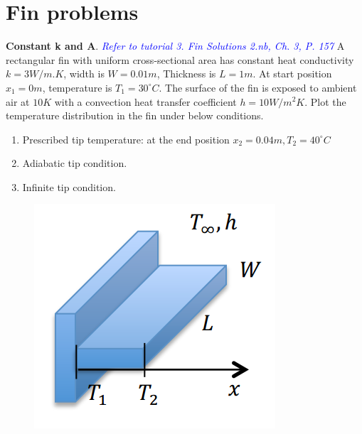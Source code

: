 \section{Fin problems}
\begin{example}
\textbf{Constant k and A}. 
\textcolor{blue} {\emph{Refer to tutorial 3.  Fin Solutions 2.nb, Ch. 3, P. 157}}
A rectangular fin with uniform cross-sectional area has constant heat conductivity
$k=3W/m.K$, width is $W=0.01m$, Thickness is $L=1m$. At start position $x_1=0m$, temperature is $T_1=30^\circ C$. The surface of the fin is exposed to ambient air at
$10K$ with a convection heat transfer coefficient $h=10W/m^2K$. Plot the temperature distribution in the fin under below conditions.
\begin{enumerate}
\item Prescribed tip temperature: at the end position $x_2=0.04m, T_2=40^\circ C$
\item Adiabatic tip condition.
\item Infinite tip condition.
\end{enumerate}
\begin{figure}[h!]
  \centering
    \includegraphics[scale=0.6]{figures/ch2/12}
\end{figure}
\end{example}

